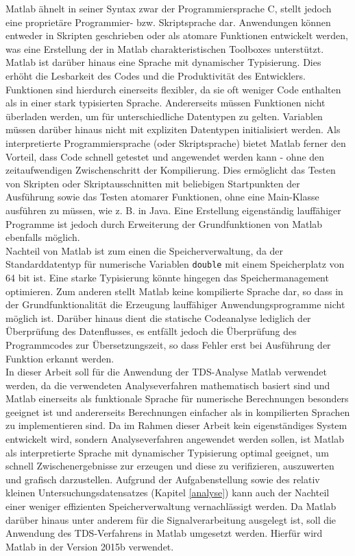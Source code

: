 Matlab ähnelt in seiner Syntax zwar der Programmiersprache C, stellt jedoch eine proprietäre Programmier- bzw. Skriptsprache dar. Anwendungen können entweder in Skripten geschrieben oder als atomare Funktionen entwickelt werden, was eine Erstellung der in Matlab charakteristischen Toolboxes unterstützt. Matlab ist darüber hinaus eine Sprache mit dynamischer Typisierung. Dies erhöht die Lesbarkeit des Codes und die Produktivität des Entwicklers. Funktionen sind hierdurch einerseits flexibler, da sie oft weniger Code enthalten als in einer stark typisierten Sprache. Andererseits müssen Funktionen nicht überladen werden, um für unterschiedliche Datentypen zu gelten. Variablen müssen darüber hinaus nicht mit expliziten Datentypen initialisiert werden. Als interpretierte Programmiersprache (oder Skriptsprache) bietet Matlab ferner den Vorteil, dass Code schnell getestet und angewendet werden kann - ohne den zeitaufwendigen Zwischenschritt der Kompilierung. Dies ermöglicht das Testen von Skripten oder Skriptausschnitten mit beliebigen Startpunkten der Ausführung sowie das Testen atomarer Funktionen, ohne eine Main-Klasse ausführen zu müssen, wie z. B. in Java. Eine Erstellung eigenständig lauffähiger Programme ist jedoch durch Erweiterung der Grundfunktionen von Matlab ebenfalls möglich. \parencite{stein_programmieren_2012}\\

Nachteil von Matlab ist zum einen die Speicherverwaltung, da der Standarddatentyp für numerische Variablen \texttt{double} mit einem Speicherplatz von 64 bit ist. Eine starke Typisierung könnte hingegen das Speichermanagement optimieren. Zum anderen stellt Matlab keine kompilierte Sprache dar, so dass in der Grundfunktionalität die Erzeugung lauffähiger Anwendungsprogramme nicht möglich ist. Darüber hinaus dient die statische Codeanalyse lediglich der Überprüfung des Datenflusses, es entfällt jedoch die Überprüfung des Programmcodes zur Übersetzungszeit, so dass Fehler erst bei Ausführung der Funktion erkannt werden.\\

In dieser Arbeit soll für die Anwendung der \acs{TDS}-Analyse Matlab verwendet werden, da die verwendeten Analyseverfahren mathematisch basiert sind und Matlab einerseits als funktionale Sprache für numerische Berechnungen besonders geeignet ist und andererseits Berechnungen einfacher als in kompilierten Sprachen zu implementieren sind. Da im Rahmen dieser Arbeit kein eigenständiges System entwickelt wird, sondern Analyseverfahren angewendet werden sollen, ist Matlab als interpretierte Sprache mit dynamischer Typisierung optimal geeignet, um schnell Zwischenergebnisse zur erzeugen und diese zu verifizieren, auszuwerten und grafisch darzustellen. Aufgrund der Aufgabenstellung sowie des relativ kleinen Untersuchungsdatensatzes (Kapitel \ref{analyse}) kann auch der Nachteil einer weniger effizienten Speicherverwaltung vernachlässigt werden. Da Matlab darüber hinaus unter anderem für die Signalverarbeitung ausgelegt ist, soll die Anwendung des \acs{TDS}-Verfahrens in Matlab umgesetzt werden. Hierfür wird  Matlab in der Version 2015b verwendet.

